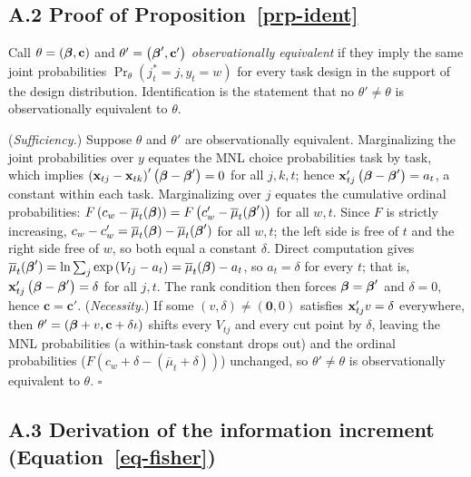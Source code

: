 \documentclass[
  letterpaper,
  DIV=11,
  numbers=noendperiod]{scrartcl}
\theoremstyle{plain}
\theoremstyle{plain}
\theoremstyle{plain}
\theoremstyle{remark}
\begin{document}
\subsection*{\texorpdfstring{A.2 Proof of
Proposition~\ref{prp-ident}}{A.2 Proof of Proposition~}}\label{a.2-proof-of-prp-ident}

Call \(\theta = \left( \boldsymbol{\beta}, \mathbf{c} \right)\) and
\(\theta' = \left( \boldsymbol{\beta}', \mathbf{c}' \right)\) \emph{observationally
equivalent} if they imply the same joint probabilities
\(\Pr_\theta \left( j^*_t = j, y_t = w \right)\) for every task design
in the support of the design distribution. Identification is the
statement that no \(\theta' \ne \theta\) is observationally equivalent
to \(\theta\).

(\emph{Sufficiency.}) Suppose \(\theta\) and \(\theta'\) are
observationally equivalent. Marginalizing the joint probabilities over
\(y\) equates the MNL choice probabilities task by task, which implies
\(\left( \mathbf{x}_{tj} - \mathbf{x}_{tk} \right)' \left( \boldsymbol{\beta} - \boldsymbol{\beta}' \right) = 0\)
for all \(j,k,t\); hence
\(\mathbf{x}_{tj}' \left( \boldsymbol{\beta} - \boldsymbol{\beta}' \right) = a_t\), a constant within
each task. Marginalizing over \(j\) equates the cumulative ordinal
probabilities:
\(F \left( c_w - \overline{\mu}_t(\boldsymbol{\beta}) \right) = F \left( c'_w - \overline{\mu}_t(\boldsymbol{\beta}') \right)\)
for all \(w,t\). Since \(F\) is strictly increasing,
\(c_w - c'_w = \overline{\mu}_t(\boldsymbol{\beta}) - \overline{\mu}_t(\boldsymbol{\beta}')\)
for all \(w,t\); the left side is free of \(t\) and the right side free
of \(w\), so both equal a constant \(\delta\). Direct computation gives
\(\overline{\mu}_t(\boldsymbol{\beta}') = \ln \sum_j \exp \left( V_{tj} - a_t \right) = \overline{\mu}_t(\boldsymbol{\beta}) - a_t\),
so \(a_t = \delta\) for every \(t\); that is,
\(\mathbf{x}_{tj}' \left( \boldsymbol{\beta} - \boldsymbol{\beta}' \right) = \delta\) for all \(j,t\).
The rank condition then forces \(\boldsymbol{\beta} = \boldsymbol{\beta}'\) and
\(\delta = 0\), hence \(\mathbf{c} = \mathbf{c}'\). (\emph{Necessity.})
If some \(\left( v, \delta \right) \ne \left( \mathbf{0}, 0 \right)\)
satisfies \(\mathbf{x}_{tj}'v = \delta\) everywhere, then
\(\theta' = \left( \boldsymbol{\beta} + v, \mathbf{c} + \delta \iota \right)\)
shifts every \(V_{tj}\) and every cut point by \(\delta\), leaving the
MNL probabilities (a within-task constant drops out) and the ordinal
probabilities (\(F(c_w + \delta - (\overline{\mu}_t + \delta))\))
unchanged, so \(\theta' \ne \theta\) is observationally equivalent to
\(\theta\). \(\square\)

\subsection*{\texorpdfstring{A.3 Derivation of the information increment
(Equation~\ref{eq-fisher})}{A.3 Derivation of the information increment (Equation~)}}\label{a.3-derivation-of-the-information-increment-eq-fisher}
\end{document}
